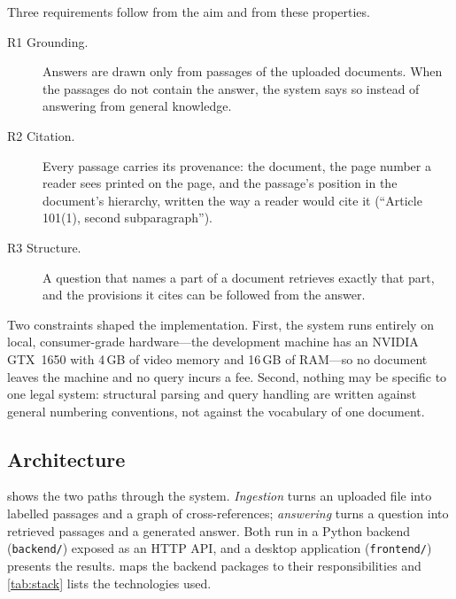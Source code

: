 Three requirements follow from the aim and from these properties.

\begin{description}
  \item[R1 Grounding.] Answers are drawn only from passages of the uploaded
  documents. When the passages do not contain the answer, the system says so
  instead of answering from general knowledge.
  \item[R2 Citation.] Every passage carries its provenance: the document, the
  page number a reader sees printed on the page, and the passage's position in
  the document's hierarchy, written the way a reader would cite it
  (``Article 101(1), second subparagraph'').
  \item[R3 Structure.] A question that names a part of a document retrieves
  exactly that part, and the provisions it cites can be followed from the
  answer.
\end{description}

Two constraints shaped the implementation. First, the system runs entirely on
local, consumer-grade hardware---the development machine has an NVIDIA
GTX~1650 with 4\,GB of video memory and 16\,GB of RAM---so no document leaves
the machine and no query incurs a fee. Second, nothing may be specific to one
legal system: structural parsing and query handling are written against
general numbering conventions, not against the vocabulary of one document.

\subsection{Architecture}

 shows the two paths through the system.
\emph{Ingestion} turns an uploaded file into labelled passages and a graph of
cross-references; \emph{answering} turns a question into retrieved passages and
a generated answer. Both run in a Python backend (\texttt{backend/}) exposed as
an HTTP API, and a desktop application (\texttt{frontend/}) presents the
results.  maps the backend packages to their
responsibilities and \cref{tab:stack} lists the technologies used.

